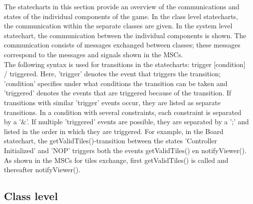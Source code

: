 The statecharts in this section provide an overview of the communications and states of the individual components of the game. In the class level statecharts, the communication within the separate classes are given. In the system level statechart, the communication between the individual components is shown. The communication consists of messages exchanged between classes; these messages correspond to the messages and signals shown in the MSCs. \\
The following syntax is used for transitions in the statecharts: trigger [condition] / triggered. Here, 'trigger' denotes the event that triggers the transition; 'condition' specifies under what conditions the transition can be taken and 'triggered' denotes the events that are triggered because of the transition. If transitions with similar 'trigger' events occur, they are listed as separate transitions. In a condition with several constraints, each constraint is separated by a '\&'. If multiple 'triggered' events are possible, they are separated by a ';' and listed in the order in which they are triggered. For example, in the Board statechart, the getValidTiles()-transition between the states 'Controller Initialized' and 'NOP' triggers both the events getValidTiles() en notifyViewer(). As shown in the MSCs for tiles exchange, first getValidTiles() is called and thereafter notifyViewer().

\subsection{Class level}

